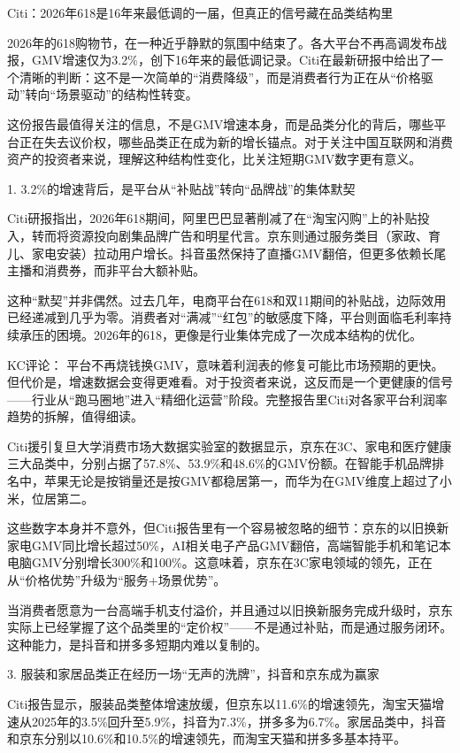 \documentclass[11pt]{ctexart}
\begin{document}
Citi：2026年618是16年来最低调的一届，但真正的信号藏在品类结构里

2026年的618购物节，在一种近乎静默的氛围中结束了。各大平台不再高调发布战报，GMV增速仅为3.2\%，创下16年来的最低调记录。Citi在最新研报中给出了一个清晰的判断：这不是一次简单的“消费降级”，而是消费者行为正在从“价格驱动”转向“场景驱动”的结构性转变。

这份报告最值得关注的信息，不是GMV增速本身，而是品类分化的背后，哪些平台正在失去议价权，哪些品类正在成为新的增长锚点。对于关注中国互联网和消费资产的投资者来说，理解这种结构性变化，比关注短期GMV数字更有意义。

1. 3.2\%的增速背后，是平台从“补贴战”转向“品牌战”的集体默契

Citi研报指出，2026年618期间，阿里巴巴显著削减了在“淘宝闪购”上的补贴投入，转而将资源投向剧集品牌广告和明星代言。京东则通过服务类目（家政、育儿、家电安装）拉动用户增长。抖音虽然保持了直播GMV翻倍，但更多依赖长尾主播和消费券，而非平台大额补贴。

这种“默契”并非偶然。过去几年，电商平台在618和双11期间的补贴战，边际效用已经递减到几乎为零。消费者对“满减”“红包”的敏感度下降，平台则面临毛利率持续承压的困境。2026年的618，更像是行业集体完成了一次成本结构的优化。

KC评论： 平台不再烧钱换GMV，意味着利润表的修复可能比市场预期的更快。但代价是，增速数据会变得更难看。对于投资者来说，这反而是一个更健康的信号——行业从“跑马圈地”进入“精细化运营”阶段。完整报告里Citi对各家平台利润率趋势的拆解，值得细读。

Citi援引复旦大学消费市场大数据实验室的数据显示，京东在3C、家电和医疗健康三大品类中，分别占据了57.8\%、53.9\%和48.6\%的GMV份额。在智能手机品牌排名中，苹果无论是按销量还是按GMV都稳居第一，而华为在GMV维度上超过了小米，位居第二。

这些数字本身并不意外，但Citi报告里有一个容易被忽略的细节：京东的以旧换新家电GMV同比增长超过50\%，AI相关电子产品GMV翻倍，高端智能手机和笔记本电脑GMV分别增长300\%和100\%。这意味着，京东在3C家电领域的领先，正在从“价格优势”升级为“服务+场景优势”。

当消费者愿意为一台高端手机支付溢价，并且通过以旧换新服务完成升级时，京东实际上已经掌握了这个品类里的“定价权”——不是通过补贴，而是通过服务闭环。这种能力，是抖音和拼多多短期内难以复制的。

3. 服装和家居品类正在经历一场“无声的洗牌”，抖音和京东成为赢家

Citi报告显示，服装品类整体增速放缓，但京东以11.6\%的增速领先，淘宝天猫增速从2025年的3.5\%回升至5.9\%，抖音为7.3\%，拼多多为6.7\%。家居品类中，抖音和京东分别以10.6\%和10.5\%的增速领先，而淘宝天猫和拼多多基本持平。
\end{document}
